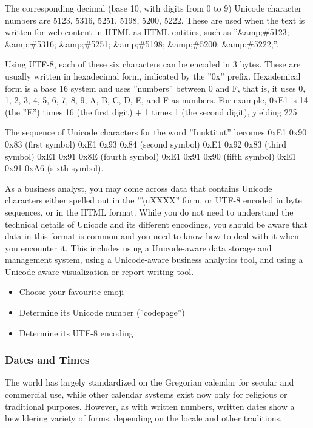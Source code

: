 The corresponding decimal (base 10, with digits from 0 to 9) Unicode character numbers are 5123, 5316, 5251, 5198, 5200, 5222. These are used when the text is written for web content in HTML as HTML entities, such as ''\&amp;\#5123; \&amp;\#5316; \&amp;\#5251; \&amp;\#5198; \&amp;\#5200; \&amp;\#5222;''.

Using UTF-8, each of these six characters can be encoded in 3 bytes. These are usually written in hexadecimal form, indicated by the ''0x'' prefix. Hexademical form is a base 16 system and uses ''numbers'' between 0 and F, that is, it uses 0, 1, 2, 3, 4, 5, 6, 7, 8, 9, A, B, C, D, E, and F as numbers. For example, 0xE1 is 14 (the ''E'') times 16 (the first digit) + 1 times 1 (the second digit), yielding 225. 

The sequence of Unicode characters for the word ''Inuktitut'' becomes 0xE1 0x90 0x83 (first symbol) 0xE1 0x93 0x84 (second symbol) 0xE1 0x92 0x83 (third symbol) 0xE1 0x91 0x8E (fourth symbol) 0xE1 0x91 0x90 (fifth symbol) 0xE1 0x91 0xA6 (sixth symbol). 

As a business analyst, you may come across data that contains Unicode characters either spelled out in the ''\textbackslash uXXXX'' form, or UTF-8 encoded in byte sequences, or in the HTML format. While you do not need to understand the technical details of Unicode and its different encodings, you should be aware that data in this format is common and you need to know how to deal with it when you encounter it. This includes using a Unicode-aware data storage and management system, using a Unicode-aware business analytics tool, and using a Unicode-aware visualization or report-writing tool.

\begin{exerciseboxcomputer}
\begin{itemize}
	\item Choose your favourite emoji
	\item Determine its Unicode number (''codepage'')
	\item Determine its UTF-8 encoding
\end{itemize}
\end{exerciseboxcomputer}

\subsubsection*{Dates and Times}

The world has largely standardized on the Gregorian calendar for secular and commercial use, while other calendar systems exist now only for religious or traditional purposes. However, as with written numbers, written dates show a bewildering variety of forms, depending on the locale and other traditions.

